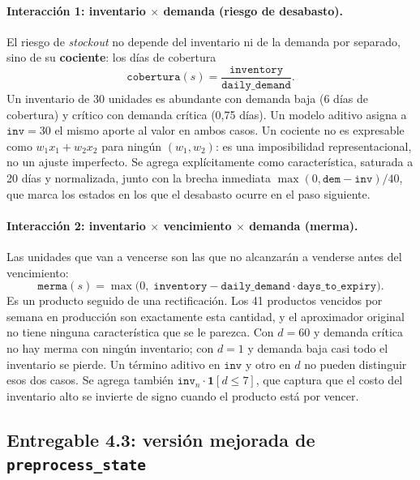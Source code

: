 \documentclass[11pt,letterpaper]{article}
\begin{document}
\paragraph{Interacción 1: inventario $\times$ demanda (riesgo de desabasto).}
El riesgo de \emph{stockout} no depende del inventario ni de la demanda por separado,
sino de su \textbf{cociente}: los días de cobertura
\[
  \texttt{cobertura}(s) = \frac{\texttt{inventory}}{\texttt{daily\_demand}}.
\]
Un inventario de 30 unidades es abundante con demanda baja (6 días de cobertura) y
crítico con demanda crítica (0{,}75 días). Un modelo aditivo asigna a
$\texttt{inv}=30$ el mismo aporte al valor en ambos casos. Un cociente no es
expresable como $w_1 x_1 + w_2 x_2$ para ningún $(w_1, w_2)$: es una imposibilidad
representacional, no un ajuste imperfecto. Se agrega
explícitamente como característica, saturada a 20 días y normalizada, junto con la
brecha inmediata $\max(0, \texttt{dem} - \texttt{inv})/40$, que marca los estados en
los que el desabasto ocurre en el paso siguiente.

\paragraph{Interacción 2: inventario $\times$ vencimiento $\times$ demanda (merma).}
Las unidades que van a vencerse son las que no alcanzarán a venderse antes del
vencimiento:
\[
  \texttt{merma}(s) = \max\bigl(0,\; \texttt{inventory} - \texttt{daily\_demand}
  \cdot \texttt{days\_to\_expiry}\bigr).
\]
Es un producto seguido de una rectificación. Los 41 productos vencidos por semana
en producción son exactamente esta cantidad, y el aproximador original no tiene
ninguna característica que se le parezca. Con
$d = 60$ y demanda crítica no hay merma con ningún inventario; con $d = 1$ y demanda
baja casi todo el inventario se pierde. Un término aditivo en $\texttt{inv}$ y otro
en $d$ no pueden distinguir esos dos casos. Se agrega también
$\texttt{inv}_n \cdot \mathbf{1}[d\le 7]$, que captura que el costo del inventario
alto se invierte de signo cuando el producto está por vencer.

\subsection{Entregable 4.3: versión mejorada de \texttt{preprocess\_state}}
\end{document}
